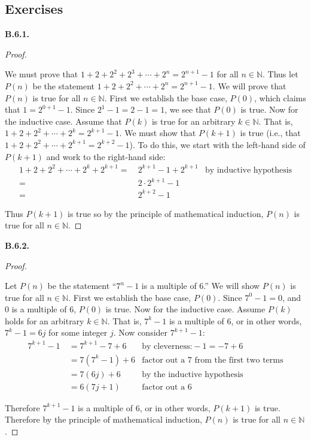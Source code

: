 \documentclass[10pt,]{book}
\theoremstyle{plain}
\theoremstyle{definition}
\theoremstyle{definition}
\theoremstyle{definition}
\theoremstyle{definition}
\numberwithin{equation}{chapter}
\def\N{\mathbb N}
\newcommand{\amp}{&}
\begin{document}
\subsection*{ Exercises}
\noindent\textbf{B.6.1.} \begin{proof}\hypertarget{proof-41}{}
\hypertarget{p-2257}{}%
We must prove that \(1 + 2 + 2^2 + 2^3 + \cdots +2^n = 2^{n+1} - 1\) for all \(n \in \N\). Thus let \(P(n)\) be the statement \(1 + 2 + 2^2 + \cdots + 2^n = 2^{n+1} - 1\). We will prove that \(P(n)\) is true for all \(n \in \N\). First we establish the base case, \(P(0)\), which claims that \(1 = 2^{0+1} -1\). Since \(2^1 - 1 = 2 - 1 = 1\), we see that \(P(0)\) is true. Now for the inductive case. Assume that \(P(k)\) is true for an arbitrary \(k \in \N\). That is, \(1 + 2 + 2^2 + \cdots + 2^k = 2^{k+1} - 1\). We must show that \(P(k+1)\) is true (i.e., that \(1 + 2 + 2^2 + \cdots + 2^{k+1} = 2^{k+2} - 1\)). To do this, we start with the left-hand side of \(P(k+1)\) and work to the right-hand side:%
\begin{align*}
1 + 2 + 2^2 + \cdots + 2^k + 2^{k+1} = \amp ~ 2^{k+1} - 1 + 2^{k+1} \amp \text{by inductive hypothesis}\\
= \amp ~2\cdot 2^{k+1} - 1 \amp\\
= \amp ~ 2^{k+2} - 1 \amp
\end{align*}
%
\par
\hypertarget{p-2258}{}%
Thus \(P(k+1)\) is true so by the principle of mathematical induction, \(P(n)\) is true for all \(n \in \N\).%
\end{proof}
\par\smallskip
\noindent\textbf{B.6.2.} \begin{proof}\hypertarget{proof-42}{}
\hypertarget{p-2260}{}%
Let \(P(n)\) be the statement ``\(7^n - 1\) is a multiple of 6.'' We will show \(P(n)\) is true for all \(n \in \N\). First we establish the base case, \(P(0)\). Since \(7^0 - 1 = 0\), and \(0\) is a multiple of 6, \(P(0)\) is true. Now for the inductive case. Assume \(P(k)\) holds for an arbitrary \(k \in \N\). That is, \(7^k - 1\) is a multiple of 6, or in other words, \(7^k - 1 = 6j\) for some integer \(j\). Now consider \(7^{k+1} - 1\):%
\begin{align*}
7^{k+1} - 1 ~ \amp = 7^{k+1} - 7 + 6 \amp \text{by cleverness:} -1 = -7 + 6\\
\amp = 7(7^k - 1) + 6 \amp \text{factor out a 7 from the first two terms}\\
\amp = 7(6j) + 6 \amp \text{by the inductive hypothesis}\\
\amp = 6(7j + 1) \amp \text{factor out a 6}
\end{align*}
%
\par
\hypertarget{p-2261}{}%
Therefore \(7^{k+1} - 1\) is a multiple of 6, or in other words, \(P(k+1)\) is true. Therefore by the principle of mathematical induction, \(P(n)\) is true for all \(n \in \N\).%
\end{proof}
\end{document}
